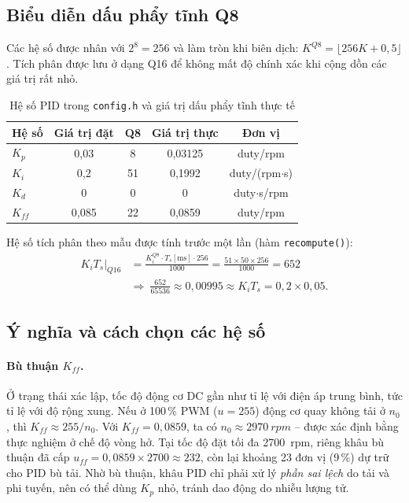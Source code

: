 \subsection{Biểu diễn dấu phẩy tĩnh Q8}
Các hệ số được nhân với $2^8=256$ và làm tròn khi biên dịch: $K^{Q8}=\lfloor 256K+0{,}5\rfloor$. Tích phân được lưu ở dạng Q16 để không mất độ chính xác khi cộng dồn các giá trị rất nhỏ.

\begin{table}[H]
\centering\small
\caption{Hệ số PID trong \texttt{config.h} và giá trị dấu phẩy tĩnh thực tế}
\label{tab:gains}
\begin{tabular}{@{}lcccc@{}}
\toprule
\textbf{Hệ số} & \textbf{Giá trị đặt} & \textbf{Q8} & \textbf{Giá trị thực} & \textbf{Đơn vị}\\
\midrule
$K_p$ & 0,03 & 8 & 0,03125 & duty/rpm\\
$K_i$ & 0,2 & 51 & 0,1992 & duty/(rpm$\cdot$s)\\
$K_d$ & 0 & 0 & 0 & duty$\cdot$s/rpm\\
$K_{ff}$ & 0,085 & 22 & 0,0859 & duty/rpm\\
\bottomrule
\end{tabular}
\end{table}

Hệ số tích phân theo mẫu được tính trước một lần (hàm \texttt{recompute()}):
\begin{equation}
  \begin{aligned}
  K_iT_s\big|_{Q16} &= \frac{K_i^{Q8}\cdot T_s[\text{ms}]\cdot256}{1000} = \frac{51\times50\times256}{1000}=652\\
  &\Rightarrow\ \frac{652}{65536}\approx0{,}00995\approx K_iT_s=0{,}2\times0{,}05.
  \end{aligned}
\end{equation}

\subsection{Ý nghĩa và cách chọn các hệ số}
\paragraph{Bù thuận $K_{ff}$.} Ở trạng thái xác lập, tốc độ động cơ DC gần như tỉ lệ với điện áp trung bình, tức tỉ lệ với độ rộng xung. Nếu ở 100\,\% PWM ($u=255$) động cơ quay không tải ở $n_0$, thì $K_{ff}\approx255/n_0$. Với $K_{ff}=0{,}0859$, ta có $n_0\approx\SI{2970}{rpm}$ -- được xác định bằng thực nghiệm ở chế độ vòng hở. Tại tốc độ đặt tối đa \SI{2700}{rpm}, riêng khâu bù thuận đã cấp $u_{ff}=0{,}0859\times2700\approx232$, còn lại khoảng 23 đơn vị (9\,\%) dự trữ cho PID bù tải. Nhờ bù thuận, khâu PID chỉ phải xử lý \emph{phần sai lệch} do tải và phi tuyến, nên có thể dùng $K_p$ nhỏ, tránh dao động do nhiễu lượng tử.

